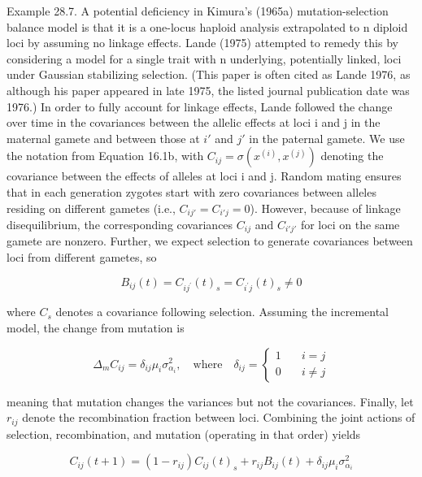 \documentclass{article}
\begin{document}
Example 28.7. A potential deficiency in Kimura’s (1965a) mutation-selection balance model is that it is a one-locus haploid analysis extrapolated to n diploid loci by assuming no linkage effects. Lande (1975) attempted to remedy this by considering a model for a single trait with n underlying, potentially linked, loci under Gaussian stabilizing selection. (This paper is often cited as Lande 1976, as although his paper appeared in late 1975, the listed journal publication date was 1976.) In order to fully account for linkage effects, Lande followed the change over time in the covariances between the allelic effects at loci i and j in the maternal gamete and between those at  $ i' $ and  $ j' $ in the paternal gamete. We use the notation from Equation 16.1b, with  $ C_{ij} = \sigma \left( x^{(i)}, x^{(j)} \right) $ denoting the covariance between the effects of alleles at loci i and j. Random mating ensures that in each generation zygotes start with zero covariances between alleles residing on different gametes (i.e.,  $ C_{ij'} = C_{i'j} = 0 $). However, because of linkage disequilibrium, the corresponding covariances  $ C_{ij} $ and  $ C_{i'j'} $ for loci on the same gamete are nonzero. Further, we expect selection to generate covariances between loci from different gametes, so

\begin{equation}
B_{i j}(t)=C_{i j^{\prime}}(t)_{s}=C_{i^{\prime}j}(t)_{s}\neq0
\tag{28.25a}
\label{eq:28_25a}
\end{equation}

where  $ C_{s} $ denotes a covariance following selection. Assuming the incremental model, the change from mutation is

\begin{equation}
\Delta_{m}C_{i j}=\delta_{i j}\mu_{i}\sigma_{\alpha_{i}}^{2},\quad\mathrm{w h e r e}\quad\delta_{i j}=\left\{\begin{aligned}1\quad&i=j\\ 0\quad&i\neq j\end{aligned}\right.
\tag{28.25b}
\label{eq:28_25b}
\end{equation}

meaning that mutation changes the variances but not the covariances. Finally, let  $ r_{ij} $ denote the recombination fraction between loci. Combining the joint actions of selection, recombination, and mutation (operating in that order) yields

\begin{equation}
C_{i j}(t+1)=(1-r_{i j})C_{i j}(t)_{s}+r_{i j}B_{i j}(t)+\delta_{i j}\mu_{i}\sigma_{\alpha_{i}}^{2}
\tag{28.25c}
\label{eq:28_25c}
\end{equation}
\end{document}
